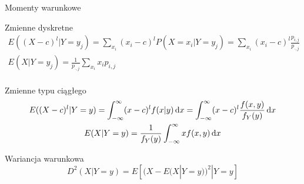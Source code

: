 \documentclass{mp}
\begin{document}
\begin{frame}{Momenty warunkowe}
{
\begin{block}{Zmienne dyskretne}
\begin{gather*}
E((X-c)^l|Y=y_j)=\sum_{x_i} (x_i-c)^lP(X=x_i|Y=y_j)=\sum_{x_i} (x_i-c)^l\frac{p_{i,j}}{p_{\cdot,j}} \\
E(X|Y=y_j)=\frac{1}{p_{\cdot,j}}\sum_{x_i} x_ip_{i,j} \\
\end{gather*}
\end{block}
}
{
\begin{block}{Zmienne typu ciągłego}
\begin{gather*}
E((X-c)^l|Y=y)=\int_{-\infty}^\infty (x-c)^lf(x|y)\,\text{d}x=\int_{-\infty}^\infty (x-c)^l\frac{f(x,y)}{f_Y(y)}\,\text{d}x \\
E(X|Y=y)=\frac{1}{f_Y(y)}\int_{-\infty}^\infty xf(x,y)\,\text{d}x
\end{gather*}
\end{block}
}
{
\begin{block}{Wariancja warunkowa}
\[ D^2(X|Y=y)=E\left[(X-E(X|Y=y))^2|Y=y\right] \]
\end{block}
}
\end{frame}
\end{document}
